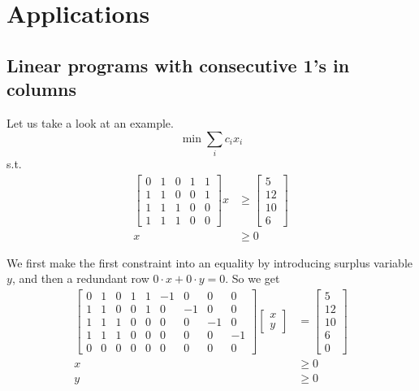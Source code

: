 \documentclass[UTF8,a4paper]{ctexart}
\begin{document}
\section{Applications}

\subsection{Linear programs with consecutive 1's in columns}

Let us take a look at an example.
\[
    \min \sum_i c_i x_i
\]
s.t.
\begin{align*}
    \begin{bmatrix}
        0&1&0&1&1\\
        1&1&0&0&1\\
        1&1&1&0&0\\
        1&1&1&0&0
    \end{bmatrix}
    x &\geq \begin{bmatrix}
        5\\
        12\\
        10\\
        6
    \end{bmatrix}
    \\
    x&\geq 0
\end{align*}

We first make the first constraint into an equality by introducing surplus variable $y$,
and then a redundant row $0\cdot x + 0\cdot y=0$.
So we get
\begin{align*}
    \begin{bmatrix}
        0&1&0&1&1& -1&0&0&0\\
        1&1&0&0&1& 0&-1&0&0\\
        1&1&1&0&0& 0&0&-1&0\\
        1&1&1&0&0& 0&0&0&-1\\
        0&0&0&0&0& 0&0&0&0
    \end{bmatrix}
    \begin{bmatrix}
        x\\
        y
    \end{bmatrix}
    &=\begin{bmatrix}
        5\\
        12\\
        10\\
        6\\
        0
    \end{bmatrix}
    \\ x&\geq 0
    \\ y&\geq 0
\end{align*}
\end{document}
